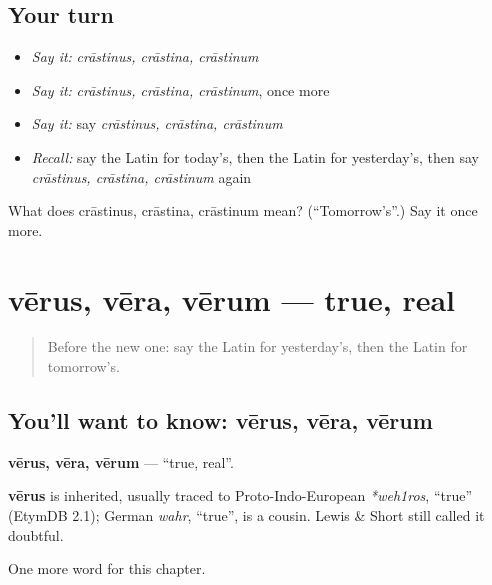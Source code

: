 \subsection*{Your turn}
\begin{itemize}
\raggedright
  \item \emph{Say it:} \emph{crāstinus, crāstina, crāstinum}
  \item \emph{Say it:} \emph{crāstinus, crāstina, crāstinum}, once more
  \item \emph{Say it:} say \emph{crāstinus, crāstina, crāstinum}
  \item \emph{Recall:} say the Latin for today's, then the Latin for yesterday's, then say \emph{crāstinus, crāstina, crāstinum} again
\end{itemize}

\begin{tcolorbox}[breakable,colback=teal!4,colframe=teal!35!black,title={Before you move on}]
What does crāstinus, crāstina, crāstinum mean? (\textquotedblleft{}Tomorrow's\textquotedblright{}.) Say it once more.
\end{tcolorbox}
\section[vērus, vēra, vērum]{vērus, vēra, vērum — true, real}

\label{lesson:LA-C215-verus}



\begin{quote}
Before the new one: say the Latin for yesterday's, then the Latin for tomorrow's.
\end{quote}

\subsection*{You'll want to know: vērus, vēra, vērum}
\textbf{vērus, vēra, vērum} — \textquotedblleft{}true, real\textquotedblright{}.

\begin{cousinweb}
\textbf{vērus} is inherited, usually traced to Proto-Indo-European \emph{*weh1ros}, \textquotedblleft{}true\textquotedblright{} (EtymDB 2.1); German \emph{wahr}, \textquotedblleft{}true\textquotedblright{}, is a cousin. Lewis \& Short still called it doubtful.
\end{cousinweb}

\begin{grammarlens}[title={What you've built}]
One more word for this chapter.
\end{grammarlens}

